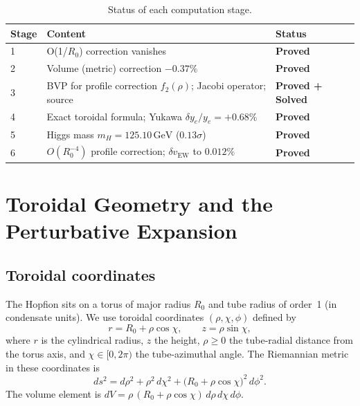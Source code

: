 \documentclass[11pt,a4paper]{article}
\theoremstyle{definition}
\theoremstyle{remark}
\newcommand{\vEW}{v_{\mathrm{EW}}}
\newcommand{\ftwo}{f_2}
\newcommand{\Rzero}{R_0}
\newcommand{\mH}{m_H}
\begin{document}
\begin{table}[h!]
\centering
\caption{Status of each computation stage.}
\label{P14:tab:status}
\begin{tabular}{lll}
\toprule
Stage & Content & Status \\
\midrule
1 & O(1/$\Rzero$) correction vanishes & \textcolor{green!60!black}{\bfseries Proved} \\
2 & Volume (metric) correction $-0.37\%$ & \textcolor{green!60!black}{\bfseries Proved} \\
3 & BVP for profile correction $\ftwo(\rho)$; Jacobi operator; source & \textcolor{green!60!black}{\bfseries Proved + Solved} \\
4 & Exact toroidal formula; Yukawa $\delta y_e/y_e=+0.68\%$ & \textcolor{green!60!black}{\bfseries Proved} \\
5 & Higgs mass $\mH=125.10\,\mathrm{GeV}$ ($0.13\sigma$) & \textcolor{green!60!black}{\bfseries Proved} \\
6 & $O(\Rzero^{-4})$ profile correction; $\delta\vEW$ to $0.012\%$ & \textcolor{green!60!black}{\bfseries Proved} \\
\bottomrule
\end{tabular}
\end{table}

\section{Toroidal Geometry and the Perturbative Expansion}
\label{P14:sec:geometry}

\subsection{Toroidal coordinates}

The Hopfion sits on a torus of major radius $\Rzero$ and tube radius of
order~1 (in condensate units).
We use toroidal coordinates $(\rho,\chi,\phi)$ defined by
\begin{equation}
  r = \Rzero + \rho\cos\chi, \qquad z = \rho\sin\chi,
  \label{P14:eq:torus_coords}
\end{equation}
where $r$ is the cylindrical radius, $z$ the height, $\rho\ge0$ the
tube-radial distance from the torus axis, and $\chi\in[0,2\pi)$ the
tube-azimuthal angle.
The Riemannian metric in these coordinates is
\begin{equation}
  ds^2 = d\rho^2 + \rho^2\,d\chi^2 + \bigl(\Rzero+\rho\cos\chi\bigr)^2\,d\phi^2.
  \label{P14:eq:metric}
\end{equation}
The volume element is $dV = \rho\,(\Rzero+\rho\cos\chi)\,d\rho\,d\chi\,d\phi$.
\end{document}
